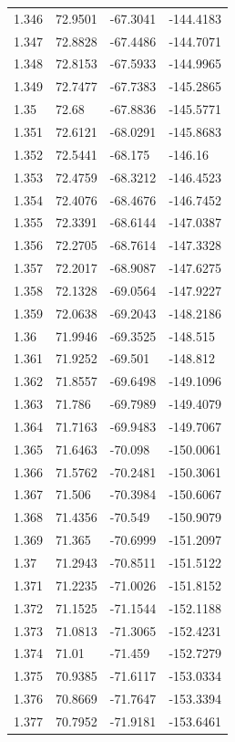 \begin{tabular}{llll}
1.346 & 72.9501 & -67.3041 & -144.4183 \\
1.347 & 72.8828 & -67.4486 & -144.7071 \\
1.348 & 72.8153 & -67.5933 & -144.9965 \\
1.349 & 72.7477 & -67.7383 & -145.2865 \\
1.35 & 72.68 & -67.8836 & -145.5771 \\
1.351 & 72.6121 & -68.0291 & -145.8683 \\
1.352 & 72.5441 & -68.175 & -146.16 \\
1.353 & 72.4759 & -68.3212 & -146.4523 \\
1.354 & 72.4076 & -68.4676 & -146.7452 \\
1.355 & 72.3391 & -68.6144 & -147.0387 \\
1.356 & 72.2705 & -68.7614 & -147.3328 \\
1.357 & 72.2017 & -68.9087 & -147.6275 \\
1.358 & 72.1328 & -69.0564 & -147.9227 \\
1.359 & 72.0638 & -69.2043 & -148.2186 \\
1.36 & 71.9946 & -69.3525 & -148.515 \\
1.361 & 71.9252 & -69.501 & -148.812 \\
1.362 & 71.8557 & -69.6498 & -149.1096 \\
1.363 & 71.786 & -69.7989 & -149.4079 \\
1.364 & 71.7163 & -69.9483 & -149.7067 \\
1.365 & 71.6463 & -70.098 & -150.0061 \\
1.366 & 71.5762 & -70.2481 & -150.3061 \\
1.367 & 71.506 & -70.3984 & -150.6067 \\
1.368 & 71.4356 & -70.549 & -150.9079 \\
1.369 & 71.365 & -70.6999 & -151.2097 \\
1.37 & 71.2943 & -70.8511 & -151.5122 \\
1.371 & 71.2235 & -71.0026 & -151.8152 \\
1.372 & 71.1525 & -71.1544 & -152.1188 \\
1.373 & 71.0813 & -71.3065 & -152.4231 \\
1.374 & 71.01 & -71.459 & -152.7279 \\
1.375 & 70.9385 & -71.6117 & -153.0334 \\
1.376 & 70.8669 & -71.7647 & -153.3394 \\
1.377 & 70.7952 & -71.9181 & -153.6461 \\

\end{tabular}
